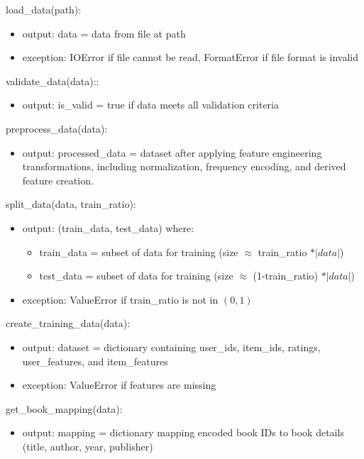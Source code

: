 \documentclass[12pt, titlepage]{article}
\begin{document}
\noindent load\_data(path):
\begin{itemize}
\item output: data = data from file at path
\item exception: IOError if file cannot be read, FormatError if file format is invalid
\end{itemize}

\noindent validate\_data(data)::
\begin{itemize}
\item output: is\_valid = true if data meets all validation criteria
\end{itemize}

\noindent preprocess\_data(data):
\begin{itemize}
\item output: processed\_data = dataset after applying feature engineering transformations, including normalization, frequency encoding, and derived feature creation.
\end{itemize}

\noindent split\_data(data, train\_ratio):
\begin{itemize}
\item output: (train\_data, test\_data) where:
\begin{itemize}
  \item train\_data = subset of data for training (size $\approx$ train\_ratio $* |data|$)
  \item test\_data = subset of data for training (size $\approx$ (1-train\_ratio) $* |data|$)
\end{itemize}
\item exception: ValueError if train\_ratio is not in $(0,1)$
\end{itemize}

\noindent create\_training\_data(data):
\begin{itemize}
\item output: dataset = dictionary containing user\_ids, item\_ids, ratings, user\_features, and item\_features
\item exception: ValueError if features are missing
\end{itemize}

\noindent get\_book\_mapping(data):
\begin{itemize}
\item output: mapping = dictionary mapping encoded book IDs to book details (title, author, year, publisher)
\end{itemize}
\end{document}
